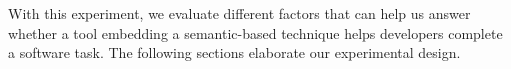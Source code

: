  

With this experiment, we evaluate different factors that can help us answer whether 
a tool embedding a semantic-based technique helps developers complete a software task. 
The following sections elaborate our experimental design. 


















